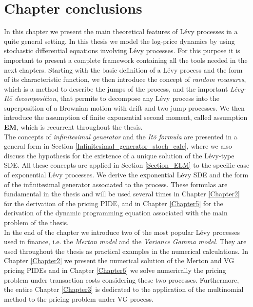 \section{Chapter conclusions}

In this chapter we present the main theoretical features of Lévy processes in a quite general setting. 
In this thesis we model the log-price dynamics by using stochastic differential equations involving Lévy processes. 
For this purpose it is important to present a complete framework containing all the tools needed in the next chapters.
Starting with the basic definition of a Lévy process and the form of its characteristic function, we then introduce the concept of \emph{random measures},
which is a method to describe the jumps of the process, and the important \emph{Lévy-It\=o decomposition}, that permits to decompose any Lévy process into 
the superposition of a Brownian motion with drift and two jump processes.
We then introduce the assumption of finite exponential second moment, called assumption \textbf{EM}, which is recurrent throughout the thesis.\\
The concepts of \emph{infinitesimal generator} and the \emph{It\=o formula} are presented in a general form in Section \ref{Infinitesimal_generator_stoch_calc}, where we 
also discuss the hypothesis for the existence of a unique solution of the Lévy-type SDE. 
All these concepts are applied in Section \ref{Section_ELM} to the specific case of exponential Lévy processes. 
We derive the exponential Lévy SDE and the form of the infinitesimal generator associated to the process.   
These formulas are fundamental in the thesis and will be used several times in Chapter \ref{Chapter2} 
for the derivation of the pricing PIDE, and in Chapter \ref{Chapter5} for the derivation of the 
dynamic programming equation associated with the main problem of the thesis.\\
In the end of the chapter we introduce two of the most popular Lévy processes used in finance, i.e. the \emph{Merton model} and the \emph{Variance Gamma model}.
They are used throughout the thesis as practical examples in the numerical calculations.
In Chapter \ref{Chapter2} we present the numerical solution of the Merton and VG pricing PIDEs and 
in Chapter \ref{Chapter6} we solve numerically the pricing problem under transaction costs considering these two processes.
Furthermore, the entire Chapter \ref{Chapter3} is dedicated to the application of the multinomial method to the pricing problem under VG process. 



